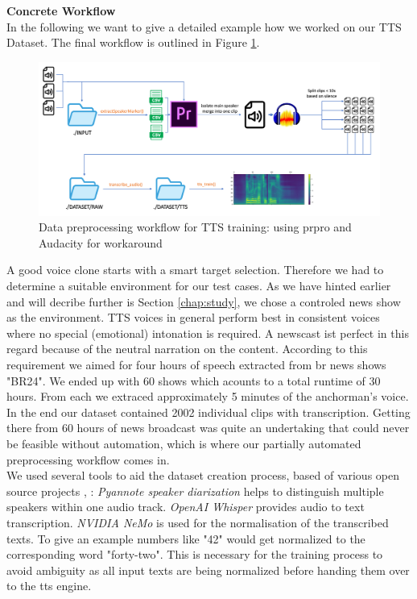 \documentclass[
  a4paper,  %
  twoside,  %
  bibliography=totoc,
  headsepline,
  cleardoublepage=empty,
  parskip=half,
  draft=false
]{scrbook}
\begin{document}
\textbf{Concrete Workflow} \\
In the following we want to give a detailed example how we worked on our TTS Dataset. The final workflow is outlined in Figure \ref{fig:dvt-tts-wf}.
\begin{figure}[h]
  \centering
  \includegraphics[width=1\textwidth]{./graphics/images/tts/tts prpro.png}
  \caption{Data preprocessing workflow for TTS training: using \gls{prpro} and Audacity for workaround}
  \label{fig:dvt-tts-wf}
\end{figure}
A good voice clone starts with a smart target selection. Therefore we had to determine a suitable environment for our test cases. As we have hinted earlier and will decribe further is Section \ref{chap:study}, we chose a controled news show as the environment. TTS voices in general perform best in consistent voices where no special (emotional) intonation is required. A newscast ist perfect in this regard because of the neutral narration on the content. 
According to this requirement we aimed for four hours of speech extracted from \gls{br} news shows "BR24". We ended up with 60 shows which acounts to a total runtime of 30 hours. From each we extraced approximately 5 minutes of the anchorman's voice.\\
In the end our dataset contained 2002 individual clips with transcription. Getting there from 60 hours of news broadcast was quite an undertaking that could never be feasible without automation, which is where our partially automated preprocessing workflow comes in. \\
We used several tools to aid the dataset creation process, based of various open source projects \cite{micaAudioSplitterUsing2023}, \cite{harperEndtoEndToolkitVoice2023}: \textit{Pyannote speaker diarization} helps to distinguish multiple speakers within one audio track. \textit{OpenAI Whisper} provides audio to text transcription. \textit{NVIDIA NeMo} is used for the normalisation of the transcribed texts. To give an example numbers like "42" would get normalized to the corresponding word "forty-two". This is necessary for the training process to avoid ambiguity as all input texts are being normalized before handing them over to the \gls{tts} engine. \\
\end{document}

